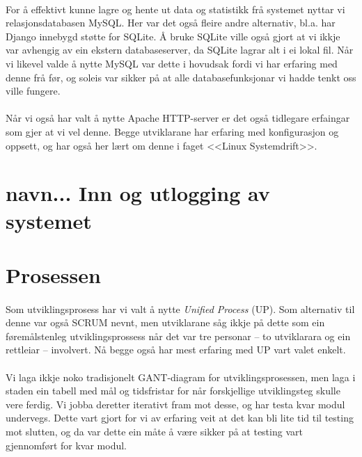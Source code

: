 \documentclass[nynorsk,12pt,a4paper,oneside]{book}
\begin{document}
\paragraph{}
For å effektivt kunne lagre og hente ut data og statistikk frå systemet nyttar vi relasjonsdatabasen MySQL. Her var det også fleire andre alternativ, bl.a. har Django innebygd støtte for SQLite. Å bruke SQLite ville også gjort at vi ikkje var avhengig av ein ekstern databaseserver, da SQLite lagrar alt i ei lokal fil. Når vi likevel valde å nytte MySQL var dette i hovudsak fordi vi har erfaring med denne frå før, og soleis var sikker på at alle databasefunksjonar vi hadde tenkt oss ville fungere.  
\paragraph{}
Når vi også har valt å nytte Apache HTTP-server er det også tidlegare erfaingar som gjer at vi vel denne. Begge utviklarane har erfaring med konfigurasjon og oppsett, og har også her lært om denne i faget <<Linux Systemdrift>>. 

\section{navn... Inn og utlogging av systemet}
\paragraph{}

\section{Prosessen}
\paragraph{}
Som utviklingsprosess har vi valt å nytte \emph{Unified Process} (UP). Som alternativ til denne var også SCRUM nevnt, men utviklarane såg ikkje på dette som ein føremålstenleg utviklingsprossess når det var tre personar -- to utviklarara og ein rettleiar -- involvert. Nå begge også har mest erfaring med UP vart valet enkelt. 
\paragraph{}
Vi laga ikkje noko tradisjonelt GANT-diagram for utviklingsprosessen, men laga i staden ein tabell med mål og tidsfristar for når forskjellige utviklingsteg skulle vere ferdig. Vi jobba deretter iterativt fram mot desse, og har testa kvar modul undervegs. Dette vart gjort for vi av erfaring veit at det kan bli lite tid til testing mot slutten, og da var dette ein måte å være sikker på at testing vart gjennomført for kvar modul. 
\end{document}
